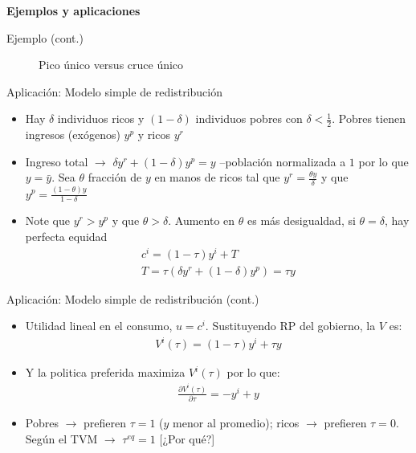 \documentclass[
  ignorenonframetext,
]{beamer}
\providecommand{\tightlist}{%
  \setlength{\itemsep}{0pt}\setlength{\parskip}{0pt}}\usepackage{longtable,booktabs,array}
\begin{document}
\begin{frame}{\textbf{Ejemplos y aplicaciones}}
\begin{block}{Ejemplo (cont.)}
\begin{figure}
\caption{Pico único versus cruce único}

\end{figure}
\end{block}

\begin{block}{Aplicación: Modelo simple de redistribución}
\protect\hypertarget{aplicaciuxf3n-modelo-simple-de-redistribuciuxf3n}{}
\begin{itemize}
\tightlist
\item
  Hay \(\delta\) individuos ricos y \((1-\delta)\) individuos pobres con
  \(\delta < \frac{1}{2}\). Pobres tienen ingresos (exógenos) \(y^{p}\)
  y ricos \(y^{r}\)
\item
  Ingreso total \(\longrightarrow\) \(\delta y^{r}+(1-\delta)y^{p}=y\)
  --población normalizada a \(1\) por lo que \(y=\bar{y}\). Sea
  \(\theta\) fracción de \(y\) en manos de ricos tal que
  \(y^{r}=\frac{\theta y}{\delta}\) y que
  \(y^{p}=\frac{(1-\theta)y}{1-\delta}\)
\item
  Note que \(y^{r} > y^{p}\) y que \(\theta > \delta\). Aumento en
  \(\theta\) es más desigualdad, si \(\theta=\delta\), hay perfecta
  equidad \[\begin{aligned}
  c^{i}=(1-\tau)y^{i}+T \\
  T=\tau(\delta y^{r}+(1-\delta)y^{p})=\tau y
  \end{aligned}\]
\end{itemize}
\end{block}

\begin{block}{Aplicación: Modelo simple de redistribución (cont.)}
\protect\hypertarget{aplicaciuxf3n-modelo-simple-de-redistribuciuxf3n-cont.}{}
\begin{itemize}
\tightlist
\item
  Utilidad lineal en el consumo, \(u=c^{i}\). Sustituyendo RP del
  gobierno, la \(V\) es: \[\begin{aligned}
  V^{i}(\tau)=(1-\tau)y^{i}+\tau y
  \end{aligned}\]
\item
  Y la politica preferida maximiza \(V^{i}(\tau)\) por lo que:
  \[\begin{aligned}
  \frac{\partial V^{i}(\tau)}{\partial \tau}=-y^{i}+y
  \end{aligned}\]
\item
  Pobres \(\longrightarrow\) prefieren \(\tau=1\) (\(y\) menor al
  promedio); ricos \(\longrightarrow\) prefieren \(\tau=0\). Según el
  TVM \(\longrightarrow\) \(\tau^{eq}=1\) {[}¿Por qué?{]}
\end{itemize}
\end{block}


\end{frame}
\end{document}
